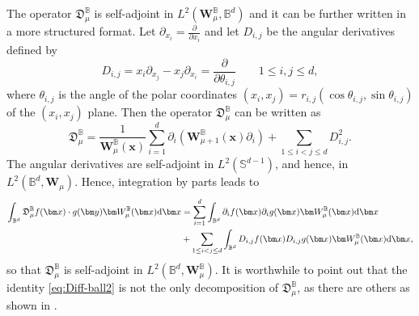 \documentclass{amsart}
\theoremstyle{remark}
\def\d{\mathrm{d}}
\def\sph{{\mathbb{S}^{d-1}}}
\def\fD{{\mathfrak D}}
\def\t{{\theta}}
\def\Wb{{\bm W}}
\def\BB{{\mathbb B}}
\begin{document}
The operator $\fD_\mu^\BB$ is self-adjoint in $L^2(\bm W_\mu^\BB, \BB^d)$ and it can be further written in a 
more structured format. Let $\partial_{x_i} = \frac{\partial}{\partial x_i}$ and let $D_{i,j}$ be the angular derivatives 
defined by 
\begin{equation} \label{eq:Dij}
  D_{i,j} = x_i \partial_{x_j} - x_j \partial_{x_i} = \frac{\partial} {\partial \t_{i,j}} \qquad 1 \le i, j \le d,
\end{equation}
where $\t_{i,j}$ is the angle of the polar coordinates $(x_i, x_j) = r_{i,j} (\cos \t_{i,j}, \sin \t_{i,j})$ of the $(x_i,x_j)$ plane. 
Then the operator $\fD_\mu^\BB$ can be written as 
\begin{equation} \label{eq:Diff-ball2}
\fD_\mu^\BB =  \frac1 { \bm W_\mu^\BB(\bm x) }  \sum_{i=1}^d \partial_i \left( \bm W_{\mu+1}^\BB (\bm x) \partial_i \right) 
+ \sum_{1 \le i< j \le d} D_{i,j}^2.
\end{equation}
The angular derivatives are self-adjoint in $L^2(\sph)$, and hence, in $L^2(\BB^d, \Wb_\mu)$. Hence, integration 
by parts leads to 
\begin{align} \label{eq:Diff-ball3}
\int_{\BB^d} \fD_\mu^\BB f(\bm x) \cdot g(\bm y) \bm W_\mu^\BB (\bm x) \d \bm x 
   & =  \sum_{i=1}^d \int_{\BB^d}\partial_i f(\bm x) \partial_i g(\bm x) \bm W_{\mu}^\BB (\bm x) \d \bm x\\
   &   + \sum_{1 \le i< j \le d}  \int_{\BB^d} D_{i,j} f(\bm x) D_{i,j} g(\bm x) \bm W_{\mu}^\BB (\bm x)\d \bm x, \notag
\end{align}
so that $\fD_\mu^\BB$ is self-adjoint in $L^2(\BB^d, \Wb_\mu^\BB)$. It is worthwhile to point out that the 
identity \eqref{eq:Diff-ball2} is not the only decomposition of $\fD_\mu^\BB$, as there are others as 
shown in \cite{BX}. 
\end{document}

